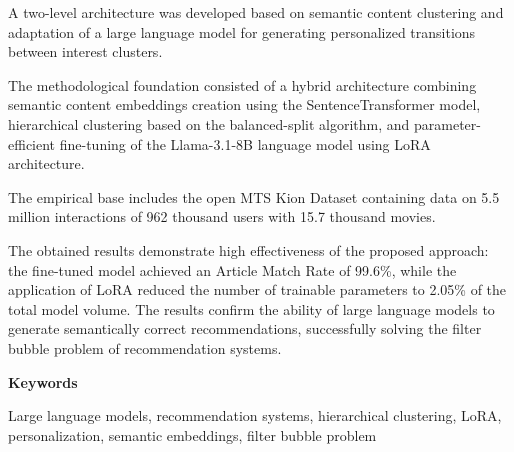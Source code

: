 A two-level architecture was developed based on semantic content clustering and adaptation of a large language model for generating personalized transitions between interest clusters.

The methodological foundation consisted of a hybrid architecture combining semantic content embeddings creation using the SentenceTransformer model, hierarchical clustering based on the balanced-split algorithm, and parameter-efficient fine-tuning of the Llama-3.1-8B language model using LoRA architecture.

The empirical base includes the open MTS Kion Dataset containing data on 5.5 million interactions of 962 thousand users with 15.7 thousand movies.

The obtained results demonstrate high effectiveness of the proposed approach: the fine-tuned model achieved an Article Match Rate of 99.6\%, while the application of LoRA reduced the number of trainable parameters to 2.05\% of the total model volume. The results confirm the ability of large language models to generate semantically correct recommendations, successfully solving the filter bubble problem of recommendation systems.

\textbf{Keywords}

Large language models, recommendation systems, hierarchical clustering, LoRA, personalization, semantic embeddings, filter bubble problem
